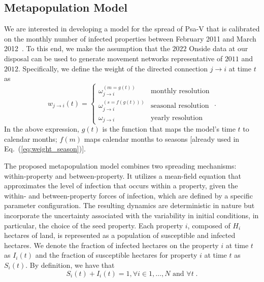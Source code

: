 \documentclass[aps,physrev,reprint,superscriptaddress]{revtex4-1}
\begin{document}
\subsection{Metapopulation Model}


We are interested in developing a model for the spread of  Psa-V that is calibrated on the monthly number of infected properties between February 2011 and March 2012~\cite{greer2012costs}. To this end, we make the assumption that the $2022$ Onside data at our disposal can be used to generate movement networks representative of $2011$ and $2012$. Specifically, we define the weight of the directed connection $j \to i$ at time $t$ as
\begin{equation}
w_{j \to i}(t) = \left\{
\begin{array}{ll}
\omega^{(m = g(t))}_{j \to i} & \textrm {monthly resolution}
\\
\omega^{(s = f(g(t)))}_{j \to i} & \textrm {seasonal resolution}
\\
\omega_{j \to i} & \textrm {yearly resolution}
\end{array}
\right.\; .
    \label{eq:weight_net}
\end{equation}
In the above expression, $g(t)$ is the function that maps the model's time $t$ to calendar months; $f(m)$ maps calendar months to seasons [already used in Eq.~(\ref{eq:weight_season})].

The proposed metapopulation model combines two spreading mechanisms: within-property and between-property. It utilizes a mean-field equation that approximates the level of infection that occurs within a property, given the within- and between-property forces of infection, which are defined by a specific parameter configuration. The resulting dynamics are deterministic in nature but incorporate the uncertainty associated with the variability in initial conditions, in particular, the choice of the seed property. Each property $i$, composed of $H_i$ hectares of land, is represented as a population of susceptible and infected hectares. We denote the fraction of infected hectares on the property $i$ at time $t$ as $I_i(t)$ and the fraction of susceptible hectares for property $i$ at time $t$ as $S_i(t)$. 
By definition, we have that
\[
S_i(t) + I_i(t) = 1, \forall i \in {1, \ldots, N} \textrm{ and } \forall t  \; .
\]
\end{document}
